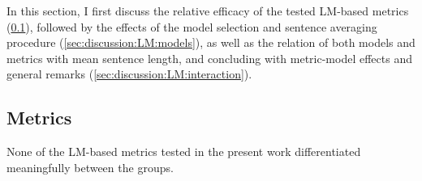In this section, I first discuss the relative efficacy of the tested LM-based metrics (\ref{sec:discussion:LM:metrics}), followed by the effects of the model selection and sentence averaging procedure (\ref{sec:discussion:LM:models}), as well as the relation of both models and metrics with mean sentence length, and concluding with metric-model effects and general remarks (\ref{sec:discussion:LM:interaction}).


\subsection{Metrics}
\label{sec:discussion:LM:metrics}


None of the LM-based metrics tested in the present work differentiated meaningfully between the groups.

